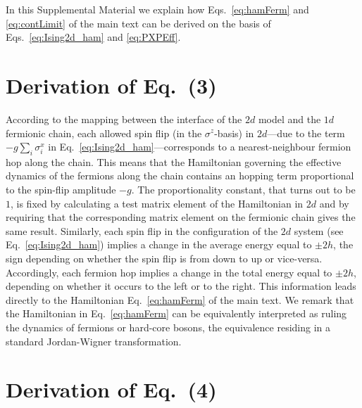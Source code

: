 \documentclass[reprint,aps,prl,superscriptaddress,english,nolongbibliography]{revtex4-2}
\begin{document}
In this Supplemental Material we explain how Eqs.~\eqref{eq:hamFerm} and \eqref{eq:contLimit} of the main text can be derived on the basis of Eqs.~\eqref{eq:Ising2d_ham} and \eqref{eq:PXPEff}. 


\section*{Derivation of Eq.~(3)}

According to the mapping between the interface of the $2d$ model and the $1d$ fermionic chain, each allowed spin flip (in the $\sigma^z$-basis) in $2d$---due to the term $ - g \sum_i \sigma^x_i $ in Eq.~\eqref{eq:Ising2d_ham}---corresponds to a nearest-neighbour fermion hop along the chain. This means  that the Hamiltonian governing the effective dynamics of the fermions along the chain contains an hopping term proportional to the spin-flip amplitude $-g$. The proportionality constant, that turns out to be $1$, is fixed by calculating a test matrix element of the Hamiltonian in $2d$ and by requiring that the corresponding matrix element on the fermionic chain gives the same result. Similarly, each spin flip in the configuration of the $2d$ system (see Eq.~\eqref{eq:Ising2d_ham}) implies a change in the average energy equal to $\pm 2h$, the sign depending on whether the spin flip is from down to up or vice-versa. Accordingly, each fermion hop implies a change in the total energy equal to $\pm 2h$, depending on whether it occurs to the left or to the right. This information leads directly to the Hamiltonian Eq.~\eqref{eq:hamFerm} of the main text. We remark that the Hamiltonian in Eq.~\eqref{eq:hamFerm} can be equivalently interpreted as ruling the dynamics of fermions or hard-core bosons, the equivalence residing in a standard Jordan-Wigner transformation.


\section*{Derivation of Eq.~(4)}
\end{document}
